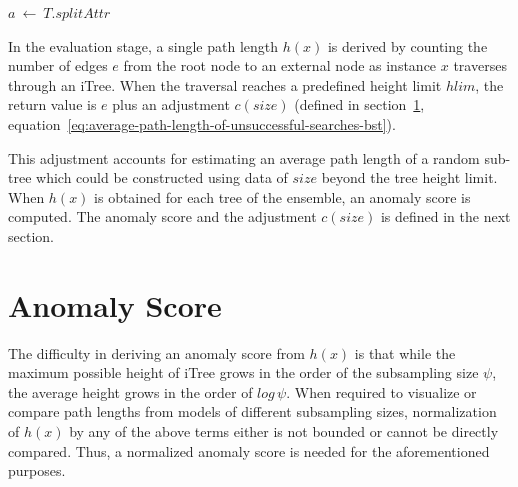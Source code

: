 \vspace{1em}
\begin{algorithm}[H]
    \caption{$PathLength(x, T, hlim, e)$}\label{alg:PathLength}
    \DontPrintSemicolon
    \SetAlgoLined


    $a \: \leftarrow \: T.splitAttr$

\end{algorithm}
\pagebreak

In the evaluation stage, a single path length $h(x)$ is derived by counting the number of edges $e$ from the root node to an external node as instance $x$ traverses through an iTree.
When the traversal reaches a predefined height limit $hlim$, the return value is $e$ plus an adjustment $c(size)$ (defined in section~\ref{sec:iforest-anomaly-score}, equation~\ref{eq:average-path-length-of-unsuccessful-searches-bst}).

This adjustment accounts for estimating an average path length of a random sub-tree which could be constructed using data of $size$ beyond the tree height limit.
When $h(x)$ is obtained for each tree of the ensemble, an anomaly score is computed.
The anomaly score and the adjustment $c(size)$ is defined in the next section.

\section{Anomaly Score}
\label{sec:iforest-anomaly-score}

The difficulty in deriving an anomaly score from $h(x)$ is that while the maximum possible height of iTree grows in the order of the subsampling size $\psi$, the average height grows in the order of $log\,\psi$.
When required to visualize or compare path lengths from models of different subsampling sizes, normalization of $h(x)$ by any of the above terms either is not bounded or cannot be directly compared.
Thus, a normalized anomaly score is needed for the aforementioned purposes.

